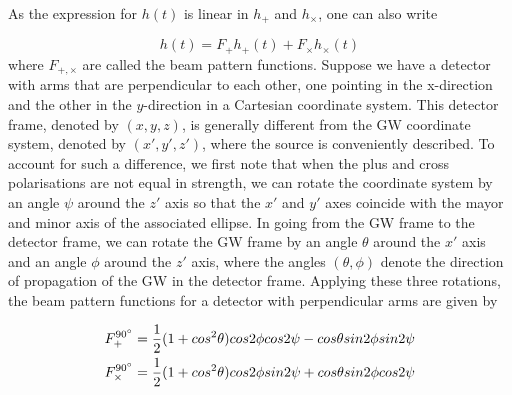 \documentclass[binding=0.6cm, LaM]{sapthesis}
\begin{document}
As the expression for $h(t)$ is linear in $h_{+}$ and $h_{\times}$, one can also write

\begin{equation}
h(t) = F_{+}h_{+} (t) + F_{\times}h_{\times}(t)
\end{equation}
where $F_{+,\times}$ are called the beam pattern functions. Suppose we have a detector with arms that are perpendicular to each other, one pointing in the x-direction and the other 
in the $y$-direction in a Cartesian coordinate system. This detector frame, denoted by $(x,y,z)$, is generally different from the GW coordinate system, denoted by $(x',y',z')$, where the source 
is conveniently described. To account for such a difference, we first note that when the plus and cross polarisations are not equal in strength, we can rotate the coordinate system by 
an angle $\psi$ around the $z′$ axis so that the $x′$ and $y′$ axes coincide with the mayor and minor axis of the associated ellipse.
 In going from the GW frame to the detector frame, we can rotate the GW frame by an angle $\theta$ around the $x′$ axis and an angle $\phi$ around the $z′$ axis, 
where the angles $(\theta, \phi)$ denote the direction of propagation of the GW in the detector frame. 
Applying these three rotations, the beam pattern functions for a detector with perpendicular arms are given by 

\begin{align}
F_{+}^{\ang{90}}& = {1 \over 2} (1 + cos^2 \theta)cos 2\phi cos 2 \psi - cos \theta sin2\phi sin2\psi \\
F_{\times}^{\ang{90}}& = {1 \over 2} (1 + cos^2 \theta)cos 2\phi sin 2 \psi + cos \theta sin2\phi cos2\psi
\end{align}
\end{document}
